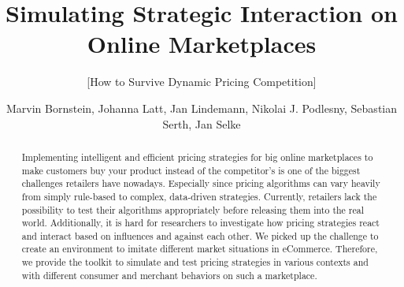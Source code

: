 \documentclass{sig-alternate-05-2015}
\begin{document}



%


\title{Simulating Strategic Interaction on Online Marketplaces}
\subtitle{[How to Survive Dynamic Pricing Competition]}



%
\author{Marvin Bornstein, Johanna Latt, Jan Lindemann, Nikolai J. Podlesny, Sebastian Serth, Jan Selke}
    

\maketitle

%
%
%
%

\begin{abstract}
Implementing intelligent and efficient pricing strategies for big online marketplaces to make customers buy your product instead of the competitor's is one of the biggest challenges retailers have nowadays. Especially since pricing algorithms can vary heavily from simply rule-based to complex, data-driven strategies. Currently, retailers lack the possibility to test their algorithms appropriately before releasing them into the real world. Additionally, it is hard for researchers to investigate how pricing strategies react and interact based on influences and against each other. We picked up the challenge to create an environment to imitate different market situations in eCommerce. Therefore, we provide the toolkit to simulate and test pricing strategies in various contexts and with different consumer and merchant behaviors on such a marketplace.
\end{abstract}
\end{document}
